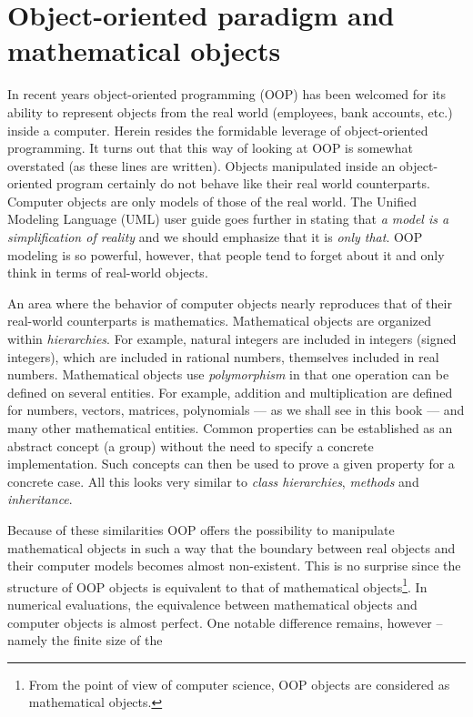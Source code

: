 \documentclass[twoside]{book}
\begin{document}
\section{Object-oriented paradigm and mathematical objects}
In recent years object-oriented programming (OOP) has been welcomed for its
ability to represent objects from the real world (employees, bank accounts,
etc.) inside a computer.
Herein resides the formidable leverage of object-oriented
programming.
It turns out that this way of looking at OOP is somewhat overstated (as these
lines are written).
Objects manipulated inside an object-oriented program certainly do not
behave like their real world counterparts. Computer objects are
only models of those of the real world. The Unified Modeling Language (UML) user
guide goes further in stating that {\it a model is a simplification of
reality} and we should emphasize that it is {\sl only that}. OOP
modeling is so powerful, however, that people tend to forget about
it and only think in terms of real-world objects.
\par
An area where the behavior of computer objects nearly reproduces
that of their real-world counterparts is mathematics. Mathematical
objects are organized within {\it hierarchies}. For example,
natural integers are included in integers (signed integers), which
are included in rational numbers, themselves included in real
numbers. Mathematical objects use {\it polymorphism} in that one
operation can be defined on several entities. For example,
addition and multiplication are defined for numbers, vectors,
matrices, polynomials --- as we shall see in this book --- and
many other mathematical entities. Common properties can be
established as an abstract concept (\eg a group) without the
need to specify a concrete implementation. Such concepts can then
be used to prove a given property for a concrete case. All this
looks very similar to {\sl class hierarchies}, {\sl methods} and
{\sl inheritance}.
\par
Because of these similarities OOP offers the possibility to
manipulate mathematical objects in such a way that the boundary
between real objects and their computer models becomes almost
non-existent. This is no surprise since the structure of OOP
objects is equivalent to that of mathematical
objects\footnote{From the point of view of computer science, OOP
objects are considered as mathematical objects.}. In numerical evaluations,
the equivalence between mathematical
objects and computer objects is almost perfect. One notable
difference remains, however -- namely the finite size of the
\end{document}
